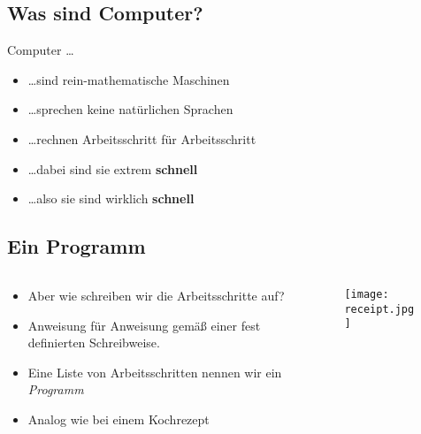 \subsection{Was sind Computer?}
\begin{frame}
	\slidehead
	Computer \dots
	\begin{itemize}[<+->]
		\item \dots sind rein-mathematische Maschinen
		\item \dots sprechen keine natürlichen Sprachen
		\item \dots rechnen Arbeitsschritt für Arbeitsschritt
		\item \dots dabei sind sie extrem \textbf{schnell}
		      \vspace{3em}
		\item \dots also sie sind wirklich \textbf{\Huge schnell}
	\end{itemize}
\end{frame}

\subsection{Ein Programm}
\begin{frame}
	\slidehead
	\begin{columns}
		\begin{column}{ 0.7\textwidth }
			\begin{itemize}[<+->]
				\item Aber wie schreiben wir die Arbeitsschritte auf?
				\item Anweisung für Anweisung gemäß einer fest definierten Schreibweise.
				\item Eine Liste von Arbeitsschritten nennen wir ein \emph{Programm}
				\item Analog wie bei einem Kochrezept
			\end{itemize}
		\end{column}%
		\begin{column}{ 0.3\textwidth }
			\begin{figure}
				\texttt{[image: receipt.jpg]}
			\end{figure}
		\end{column}
	\end{columns}
\end{frame}

